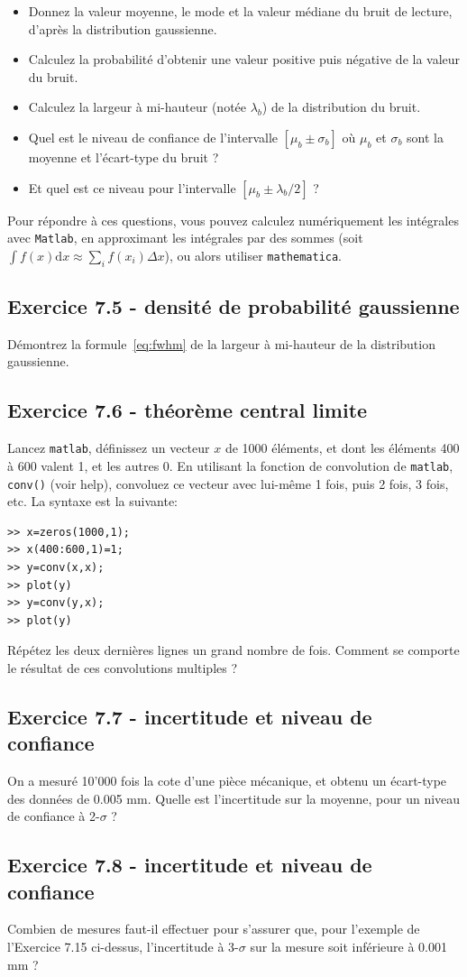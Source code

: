 \begin{itemize}
\item Donnez la valeur moyenne, le mode et la valeur médiane du bruit de lecture, d'après la distribution gaussienne.
\item Calculez la probabilité d'obtenir une valeur positive puis négative de la valeur du bruit.
\item Calculez la largeur à mi-hauteur (notée $\lambda_b$) de la distribution du bruit.
\item Quel est le niveau de confiance de l'intervalle $[\mu_b\pm\sigma_b]$ où $\mu_b$ et $\sigma_b$ sont la moyenne et l'écart-type du bruit ?
\item Et quel est ce niveau pour l'intervalle $[\mu_b\pm\lambda_b/2]$ ?
\end{itemize}
Pour répondre à ces questions, vous pouvez calculez numériquement les intégrales avec \texttt{Matlab}, en approximant les intégrales par des sommes (soit $\int f(x)\text{d}x\approx\sum_if(x_i)\Delta x$), ou alors utiliser \texttt{mathematica}.

\subsection*{Exercice 7.5 - densité de probabilité gaussienne}

Démontrez la formule~\ref{eq:fwhm} de la largeur à mi-hauteur de la distribution gaussienne.

\subsection*{Exercice 7.6 - théorème central limite}

Lancez \texttt{matlab}, définissez un vecteur $x$ de 1000 éléments, et dont les éléments 400 à 600 valent 1, et les autres 0. En utilisant la fonction de convolution de \texttt{matlab}, \texttt{conv()} (voir help), convoluez ce vecteur avec lui-même 1 fois, puis 2 fois, 3 fois, etc. La syntaxe est la suivante:
\begin{verbatim}
>> x=zeros(1000,1);
>> x(400:600,1)=1;
>> y=conv(x,x);
>> plot(y)
>> y=conv(y,x);
>> plot(y)
\end{verbatim}
Répétez les deux dernières lignes un grand nombre de fois. Comment se comporte le résultat de ces convolutions multiples ?

\newpage
\subsection*{Exercice 7.7 - incertitude et niveau de confiance}

On a mesuré 10'000 fois la cote d'une pièce mécanique, et obtenu un écart-type des données de 0.005 mm. Quelle est l'incertitude sur la moyenne, pour un niveau de confiance à 2-$\sigma$ ?

\subsection*{Exercice 7.8 - incertitude et niveau de confiance}

Combien de mesures faut-il effectuer pour s'assurer que, pour l'exemple de l'Exercice 7.15 ci-dessus, l'incertitude à 3-$\sigma$ sur la mesure soit inférieure à 0.001 mm ?
